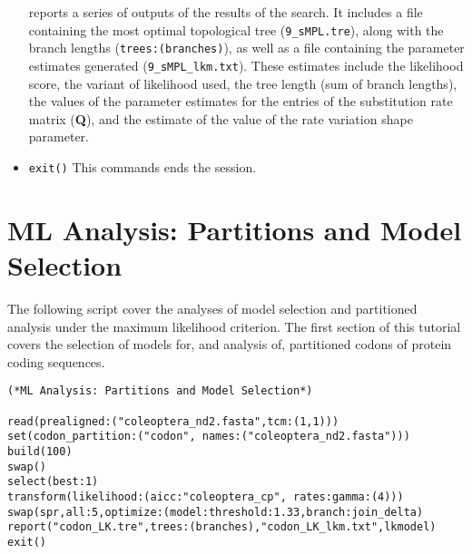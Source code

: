 \begin{itemize}
reports a series of outputs of the results of the search.  It includes a file containing the most optimal 
topological tree (\texttt{9\_sMPL.tre}), along with the branch lengths (\texttt{trees:(branches)}), 
as well as a file containing the parameter estimates generated (\texttt{9\_sMPL\_lkm.txt}). These estimates include
the likelihood score, the variant of likelihood used, the tree length (sum of branch lengths), the values 
of the parameter estimates for the entries of the substitution rate matrix (\textbf{Q}), and the estimate of the value of 
the rate variation shape parameter.
\item \texttt{exit()}  This commands ends the \poy session.
\end{itemize}


\section{ML Analysis: Partitions and Model Selection}{\label{tutorial16}}

The following script cover the analyses of model selection and partitioned analysis under 
the maximum likelihood criterion. The first section of this tutorial covers the selection 
of models for, and analysis of, partitioned codons of protein coding sequences. 

\begin{verbatim}
(*ML Analysis: Partitions and Model Selection*) 

read(prealigned:("coleoptera_nd2.fasta",tcm:(1,1)))
set(codon_partition:("codon", names:("coleoptera_nd2.fasta")))
build(100)
swap()
select(best:1)
transform(likelihood:(aicc:"coleoptera_cp", rates:gamma:(4)))
swap(spr,all:5,optimize:(model:threshold:1.33,branch:join_delta)
report("codon_LK.tre",trees:(branches),"codon_LK_lkm.txt",lkmodel)
exit()
\end{verbatim}

